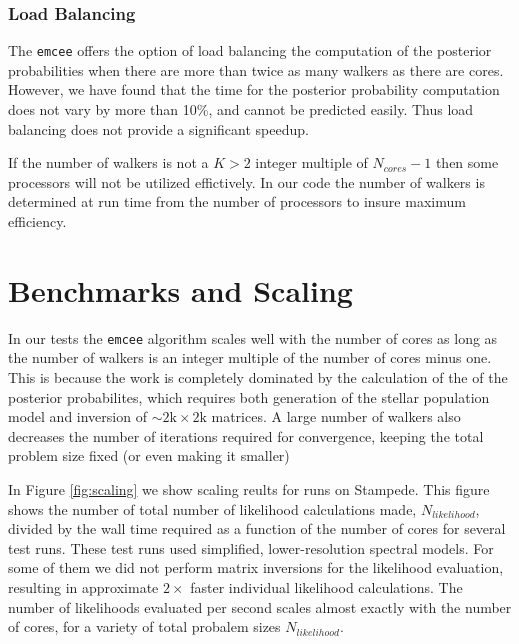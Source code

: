 \documentclass[11pt,preprint]{aastex}
\begin{document}
\subsubsection{Load Balancing}
The \texttt{emcee} offers the option of load balancing the computation of the posterior probabilities when there are more than twice as many walkers as there are cores.  However, we have found that the time for the posterior probability computation does not vary by more than 10\%, and cannot be predicted easily. Thus load balancing does not provide a significant speedup. 

If the number of walkers is not a $K>2$ integer multiple of $N_{cores}-1$ then some processors will not be utilized effictively.  In our code the number of walkers is determined at run time from the number of processors to insure maximum efficiency.

\section{Benchmarks and Scaling}
In our tests the \texttt{emcee} algorithm scales well with the number of cores as long as the number of walkers is an integer multiple of the number of cores minus one.  This is because the work is completely dominated by the calculation of the of the posterior probabilites, which requires both generation of the stellar population model and inversion of $\sim 2\mbox{k} \times 2\mbox{k}$ matrices. A large number of walkers also decreases the number of iterations required for convergence, keeping the total problem size fixed (or even making it smaller)

In Figure \ref{fig:scaling} we show scaling reults for runs on Stampede.  This figure shows the number of total number of likelihood calculations made, $N_{likelihood}$, divided by the wall time required as a function of the number of cores for several test runs.  These test runs used simplified, lower-resolution spectral models.  For some of them we did not perform matrix inversions for the likelihood evaluation, resulting in approximate $2 \times$ faster individual likelihood calculations.  The number of likelihoods evaluated per second scales almost exactly with the number of cores, for a variety of total probalem sizes $N_{likelihood}$.
\end{document}
